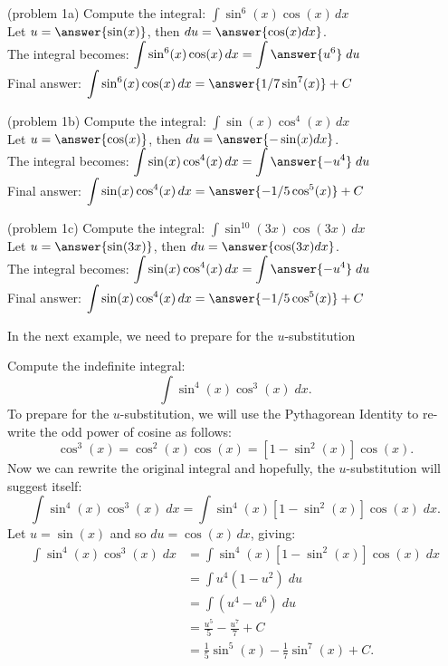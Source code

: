 \documentclass{ximera}
\begin{document}
\begin{problem}(problem 1a)
Compute the integral: $\displaystyle{\int \sin^6(x)\cos(x) \, dx}$\\
Let $u = \answer{\sin(x)}$, \; then $du = \answer{\cos(x) dx}$.\\
The integral becomes: $\displaystyle{\int \sin^6(x)\cos(x) \, dx = \int \answer{u^6} \; du}$\\
Final answer: $\displaystyle{\int \sin^{6}(x)\cos(x) \, dx = \answer{1/7 \sin^7(x)} + C}$\\
\end{problem}


\begin{problem}(problem 1b)
Compute the integral: $\displaystyle{\int \sin(x)\cos^4(x) \, dx}$\\
Let $u = \answer{\cos(x)}$, \; then $du = \answer{-\sin(x) dx}$.\\
The integral becomes: $\displaystyle{\int \sin(x)\cos^4(x) \, dx = \int \answer{-u^4} \; du}$\\
Final answer: $\displaystyle{\int \sin(x)\cos^4(x) \, dx = \answer{-1/5 \cos^5(x)} + C}$\\
\end{problem}


\begin{problem}(problem 1c)
Compute the integral: $\displaystyle{\int \sin^{10}(3x)\cos(3x) \, dx}$\\
Let $u = \answer{\sin(3x)}$, \; then $du = \answer{\cos(3x) dx}$.\\
The integral becomes: $\displaystyle{\int \sin(x)\cos^4(x) \, dx = \int \answer{-u^4} \; du}$\\
Final answer: $\displaystyle{\int \sin(x)\cos^4(x) \, dx = \answer{-1/5 \cos^5(x)} + C}$\\
\end{problem}


In the next example, we need to prepare for the $u$-substitution 

\begin{example}[example 2]
Compute the indefinite integral:
\[
\int \sin^4(x)\cos^3(x) \; dx.
\]
To prepare for the $u$-substitution, we will use the Pythagorean Identity to re-write the odd power of cosine as follows:
\[
\cos^3(x) = \cos^2(x) \cos(x) = \left[1 - \sin^2(x)\right] \cos(x).
\]
Now we can rewrite the original integral and hopefully, the $u$-substitution will suggest itself:
\[
\int \sin^4(x)\cos^3(x) \; dx = \int \sin^4(x)\left[1 - \sin^2(x)\right] \cos(x) \; dx.
\]
Let $u = \sin(x)$ and so  $du = \cos(x) \, dx$, giving:
\begin{align*}
\int \sin^4(x)\cos^3(x) \; dx &= \int \sin^4(x)\left[1 - \sin^2(x)\right] \cos(x) \; dx\\
   &= \int u^4 (1-u^2) \; du\\
   &= \int (u^4 -u^6) \; du\\
  &= \frac{u^5}{5} - \frac{u^7}{7} + C \\
  &= \frac15 \sin^5(x) - \frac17 \sin^7(x) + C.
\end{align*}
  
\end{example}
\end{document}
